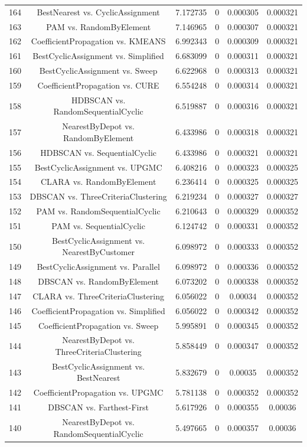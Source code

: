 \documentclass[a4paper,10pt]{article}
\begin{document}
\begin{landscape}
\begin{table}[!htp]
\begin{tabular}{cccccc}
164&BestNearest vs. CyclicAssignment&7.172735&0&0.000305&0.000321\\
163&PAM vs. RandomByElement&7.146965&0&0.000307&0.000321\\
162&CoefficientPropagation vs. KMEANS&6.992343&0&0.000309&0.000321\\
161&BestCyclicAssignment vs. Simplified&6.683099&0&0.000311&0.000321\\
160&BestCyclicAssignment vs. Sweep&6.622968&0&0.000313&0.000321\\
159&CoefficientPropagation vs. CURE&6.554248&0&0.000314&0.000321\\
158&HDBSCAN vs. RandomSequentialCyclic&6.519887&0&0.000316&0.000321\\
157&NearestByDepot vs. RandomByElement&6.433986&0&0.000318&0.000321\\
156&HDBSCAN vs. SequentialCyclic&6.433986&0&0.000321&0.000321\\
155&BestCyclicAssignment vs. UPGMC&6.408216&0&0.000323&0.000325\\
154&CLARA vs. RandomByElement&6.236414&0&0.000325&0.000325\\
153&DBSCAN vs. ThreeCriteriaClustering&6.219234&0&0.000327&0.000327\\
152&PAM vs. RandomSequentialCyclic&6.210643&0&0.000329&0.000352\\
151&PAM vs. SequentialCyclic&6.124742&0&0.000331&0.000352\\
150&BestCyclicAssignment vs. NearestByCustomer&6.098972&0&0.000333&0.000352\\
149&BestCyclicAssignment vs. Parallel&6.098972&0&0.000336&0.000352\\
148&DBSCAN vs. RandomByElement&6.073202&0&0.000338&0.000352\\
147&CLARA vs. ThreeCriteriaClustering&6.056022&0&0.00034&0.000352\\
146&CoefficientPropagation vs. Simplified&6.056022&0&0.000342&0.000352\\
145&CoefficientPropagation vs. Sweep&5.995891&0&0.000345&0.000352\\
144&NearestByDepot vs. ThreeCriteriaClustering&5.858449&0&0.000347&0.000352\\
143&BestCyclicAssignment vs. BestNearest&5.832679&0&0.00035&0.000352\\
142&CoefficientPropagation vs. UPGMC&5.781138&0&0.000352&0.000352\\
141&DBSCAN vs. Farthest-First&5.617926&0&0.000355&0.00036\\
140&NearestByDepot vs. RandomSequentialCyclic&5.497665&0&0.000357&0.00036\\

\end{tabular}
\end{table}
\end{landscape}
\end{document}
